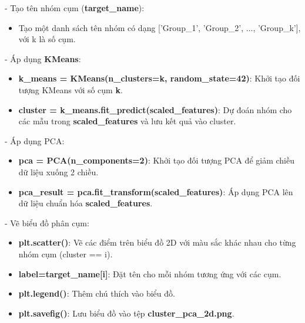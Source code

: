 - Tạo tên nhóm cụm (\textbf{target\_name}):
\begin{itemize}
    \item Tạo một danh sách tên nhóm có dạng ['Group\_1', 'Group\_2', ..., 'Group\_k'], với k là số cụm.
\end{itemize}
- Áp dụng \textbf{KMeans}:
\begin{itemize}
    \item \textbf{k\_means = KMeans(n\_clusters=k, random\_state=42)}: Khởi tạo đối tượng KMeans với số cụm \textbf{k}.
    \item \textbf{cluster = k\_means.fit\_predict(scaled\_features)}: Dự đoán nhóm cho các mẫu trong \textbf{scaled\_features} và lưu kết quả vào cluster.
\end{itemize}
- Áp dụng PCA:
\begin{itemize}
    \item \textbf{pca = PCA(n\_components=2)}: Khởi tạo đối tượng PCA để giảm chiều dữ liệu xuống 2 chiều.
    \item \textbf{pca\_result = pca.fit\_transform(scaled\_features)}: Áp dụng PCA lên dữ liệu chuẩn hóa \textbf{scaled\_features}.
\end{itemize}
- Vẽ biểu đồ phân cụm:
\begin{itemize}
    \item \textbf{plt.scatter()}: Vẽ các điểm trên biểu đồ 2D với màu sắc khác nhau cho từng nhóm cụm (cluster == i).
    \item \textbf{label=target\_name[i]}: Đặt tên cho mỗi nhóm tương ứng với các cụm.
    \item \textbf{plt.legend()}: Thêm chú thích vào biểu đồ.
    \item \textbf{plt.savefig()}: Lưu biểu đồ vào tệp \textbf{cluster\_pca\_2d.png}.
\end{itemize}
